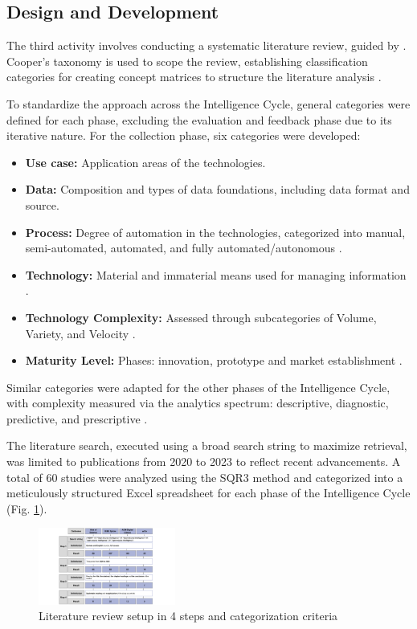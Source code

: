 \documentclass[10pt]{article}
\begin{document}
\subsection{Design and Development}
The third activity involves conducting a systematic literature review, guided by \cite{Cleven.2009}. Cooper's taxonomy \cite{Cooper.1988} is used to scope the review, establishing classification categories for creating concept matrices to structure the literature analysis \cite{Webster.2002}.

To standardize the approach across the Intelligence Cycle, general categories were defined for each phase, excluding the evaluation and feedback phase due to its iterative nature. For the collection phase, six categories were developed:
\begin{itemize}
    \item \textbf{Use case:} Application areas of the technologies.
    \item \textbf{Data:} Composition and types of data foundations, including data format and source.
    \item \textbf{Process:} Degree of automation in the technologies, categorized into manual, semi-automated, automated, and fully automated/autonomous \cite{Duncheon.2002, Billings.1997, Endsley.1999}.
    \item \textbf{Technology:} Material and immaterial means used for managing information \cite{Bleck.2004}.
    \item \textbf{Technology Complexity:} Assessed through subcategories of Volume, Variety, and Velocity \cite{Elgendy.2014, Singh.2012}.
    \item \textbf{Maturity Level:} Phases: innovation, prototype and  market establishment \cite{Stich.2022}.
\end{itemize}

Similar categories were adapted for the other phases of the Intelligence Cycle, with complexity measured via the analytics spectrum: descriptive, diagnostic, predictive, and prescriptive \cite{Delen.2013}.

The literature search, executed using a broad search string to maximize retrieval, was limited to publications from 2020 to 2023 to reflect recent advancements. A total of 60 studies were analyzed using the SQR3 method \cite{Robinson.1970} and categorized into a meticulously structured Excel spreadsheet for each phase of the Intelligence Cycle (Fig. \ref{fig:LiteratureReview}).

\begin{figure}[t]
    \centering
    \includegraphics[width=0.4\textwidth]{PDF/images/crop_Kategorisierungskriterien und Literraturreviewaufbau}
    \caption{Literature review setup in 4 steps and categorization criteria}
    \label{fig:LiteratureReview}
\end{figure}
\end{document}
